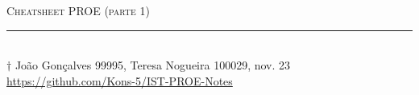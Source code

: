 \documentclass[10pt, landscape]{article}
\begin{document}
    \pagestyle{empty}

    \begin{center}
        {\Large\textsc{%
            Cheatsheet PROE (parte 1)
        }}
    \end{center}
    
    \begin{multicols*}{3}    
        

        \vfill
        \rule{0.33\columnwidth}{0.1pt}
        ~\\
        $\dag$ João Gonçalves 99995, Teresa Nogueira 100029, nov. 23 \href{https://github.com/Kons-5/IST-PROE-Notes}{https://github.com/Kons-5/IST-PROE-Notes}
    \end{multicols*}
\end{document}
